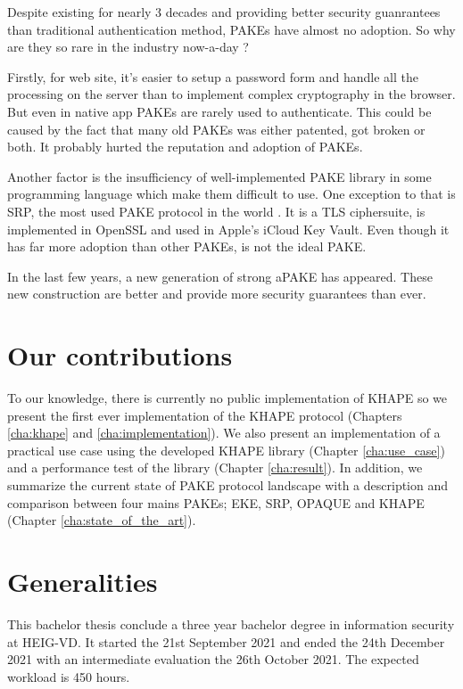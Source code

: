 \documentclass[../report.tex]{subfiles}
\begin{document}


Despite existing for nearly 3 decades and providing better security guanrantees than traditional authentication method, PAKEs have almost no adoption. So why are they so rare in the industry now-a-day ?

Firstly, for web site, it's easier to setup a password form and handle all the processing on the server than to implement complex cryptography in the browser. But even in native app PAKEs are rarely used to authenticate.
This could be caused by the fact that many old PAKEs was either patented, got broken or both. %
It probably hurted the reputation and adoption of PAKEs.

Another factor is the insufficiency of well-implemented PAKE library in some programming language %
which make them difficult to use.
One exception to that is SRP, the most used PAKE protocol in the world \cite{PAKE_Green_blog}.
It is a TLS ciphersuite, is implemented in OpenSSL and used in Apple's iCloud Key Vault. Even though it has far more adoption than other PAKEs, is not the ideal PAKE.


In the last few years, a new generation of strong aPAKE \cite{OPAQUE_Paper, KHAPE_Paper} has appeared. These new construction are better and provide more security guarantees than ever.




\section{Our contributions}
To our knowledge, there is currently no public implementation of KHAPE so we present the first ever implementation of the KHAPE protocol (Chapters \ref{cha:khape} and \ref{cha:implementation}).
We also present an implementation of a practical use case using the developed KHAPE library (Chapter \ref{cha:use_case}) and a performance test of the library (Chapter \ref{cha:result}).
In addition, we summarize the current state of PAKE protocol landscape with a description and comparison between four mains PAKEs; EKE, SRP, OPAQUE and KHAPE (Chapter \ref{cha:state_of_the_art}).


\section{Generalities}
This bachelor thesis conclude a three year bachelor degree in information security at HEIG-VD.
It started the 21st September 2021 and ended the 24th December 2021 with an intermediate evaluation the 26th October 2021. The expected workload is 450 hours.
\end{document}
